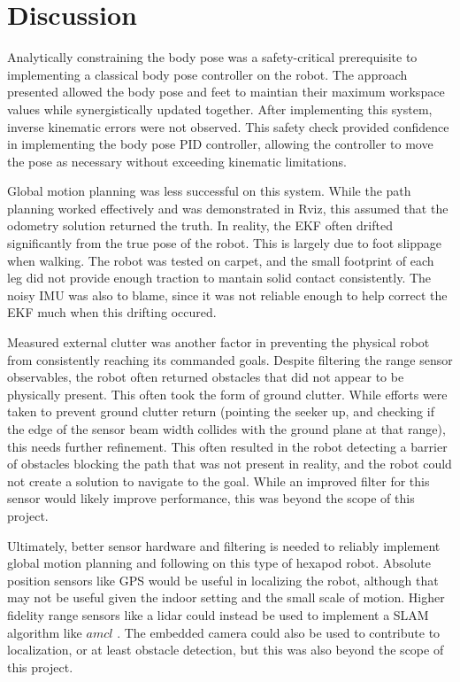 
\section{ Discussion }

Analytically constraining the body pose was a safety-critical prerequisite to implementing a classical body pose controller on the robot. The approach presented allowed the body pose and feet to maintian their maximum workspace values while synergistically updated together. After implementing this system, inverse kinematic errors were not observed. This safety check provided confidence in implementing the body pose PID controller, allowing the controller to move the pose as necessary without exceeding kinematic limitations. 

Global motion planning was less successful on this system. While the path planning worked effectively and was demonstrated in Rviz, this assumed that the odometry solution returned the truth. In reality, the EKF often drifted significantly from the true pose of the robot. This is largely due to foot slippage when walking. The robot was tested on carpet, and the small footprint of each leg did not provide enough traction to mantain solid contact consistently. The noisy IMU was also to blame, since it was not reliable enough to help correct the EKF much when this drifting occured. 

Measured external clutter was another factor in preventing the physical robot from consistently reaching its commanded goals. Despite filtering the range sensor observables, the robot often returned obstacles that did not appear to be physically present. This often took the form of ground clutter. While efforts were taken to prevent ground clutter return (pointing the seeker up, and checking if the edge of the sensor beam width collides with the ground plane at that range), this needs further refinement. This often resulted in the robot detecting a barrier of obstacles blocking the path that was not present in reality, and the robot could not create a solution to navigate to the goal. While an improved filter for this sensor would likely improve performance, this was beyond the scope of this project. 

Ultimately, better sensor hardware and filtering is needed to reliably implement global motion planning and following on this type of hexapod robot. Absolute position sensors like GPS would be useful in localizing the robot, although that may not be useful given the indoor setting and the small scale of motion. Higher fidelity range sensors like a lidar could instead be used to implement a SLAM algorithm like $amcl$ \cite{amcl}. The embedded camera could also be used to contribute to localization, or at least obstacle detection, but this was also beyond the scope of this project.

